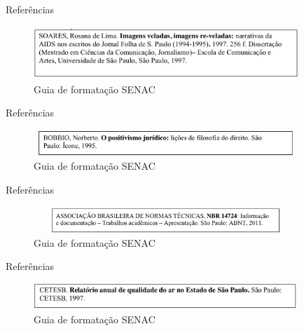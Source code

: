 \begin{frame}	
	\begin{block}{Referências}	
		 \begin{figure}[!htb]
			\centering	  				
			\includegraphics[height=2cm, width = 10cm]{./pic/referencias/dissertacoesteses.png}
			\caption{Guia de formatação SENAC \cite{GUIA_SENAC}}
			\label{fig_referencia03}
		\end{figure}
	\end{block}
\end{frame}

\begin{frame}	
	\begin{block}{Referências}	
		 \begin{figure}[!htb]
			\centering	  				
			\includegraphics[height=1cm, width = 10cm]{./pic/referencias/livroimpresso.png}
			\caption{Guia de formatação SENAC \cite{GUIA_SENAC}}
			\label{fig_referencia04}
		\end{figure}
	\end{block}
\end{frame}

\begin{frame}	
	\begin{block}{Referências}	
		 \begin{figure}[!htb]
			\centering	  				
			\includegraphics[height=1cm, width = 10cm]{./pic/referencias/normastecnicas.png}
			\caption{Guia de formatação SENAC \cite{GUIA_SENAC}}
			\label{fig_referencia05}
		\end{figure}
	\end{block}
\end{frame}

\begin{frame}	
	\begin{block}{Referências}	
		 \begin{figure}[!htb]
			\centering	  				
			\includegraphics[height=1cm, width = 10cm]{./pic/referencias/relatoriooficial.png}
			\caption{Guia de formatação SENAC \cite{GUIA_SENAC}}
			\label{fig_referencia06}
		\end{figure}
	\end{block}
\end{frame}
